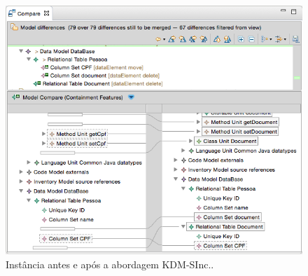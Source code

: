 \begin{figure}[!h]
	\centering
	\caption{Instância antes e após a abordagem KDM-SInc..}
	\label{fig:efeitoPropagacaoKDMSINC}
	\includegraphics[scale=0.7]{images/propagacaoKDMEfeito}
	\fautor
\end{figure}






